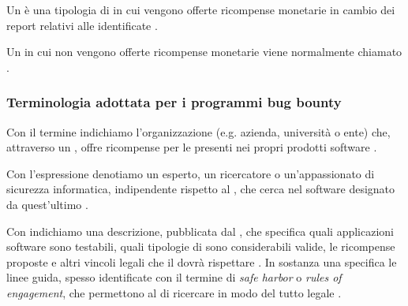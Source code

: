 \begin{definizione}
Un \BBP è una tipologia di \CVD in cui vengono offerte ricompense monetarie in cambio dei report relativi alle \vulnerability identificate \cite{walshe2023bountythesis2, walshe2022cvdpaper, akgul2020bughunters}.
\end{definizione}

\begin{definizione}
Un \CVD in cui non vengono offerte ricompense monetarie viene normalmente chiamato \VDP \cite{walshe2023bountythesis2, walshe2022cvdpaper, akgul2020bughunters}.
\end{definizione}

\subsubsection{Terminologia adottata per i programmi bug bounty}

\begin{definizione}
Con il termine \BI indichiamo l'organizzazione (e.g. azienda, università o ente) che, attraverso un \BBP, offre ricompense per le \vulnerability presenti nei propri prodotti software \cite{canidio2021verioss}.
\end{definizione}

\begin{definizione}
Con l'espressione \BH denotiamo un esperto, un ricercatore o un'appassionato di sicurezza informatica, indipendente rispetto al \BI, che cerca \vulnerability nel software designato da quest'ultimo \cite{canidio2021verioss}. 
\end{definizione}


\begin{definizione}[\BugBounty]
Con \bugbounty indichiamo una descrizione, pubblicata dal \BI, che specifica quali applicazioni software sono testabili, quali tipologie di \vulnerability sono considerabili valide, le ricompense proposte e altri vincoli legali che il \BH dovrà rispettare \cite{hoffman2021bountychain, hoffman2020bountychain}. In sostanza una \bugbounty specifica le linee guida, spesso identificate con il termine di \emph{safe harbor} o \emph{rules of engagement}, che permettono al \BH di ricercare \vulnerability in modo del tutto legale \cite{walshe2022cvdpaper, walshe2020bountypaper, walshe2023bountythesis3}.
\end{definizione}

